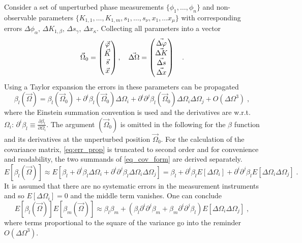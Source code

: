 Consider a set of unperturbed phase measurements $ \{\phi_1, \ldots, \phi_n\} $ and non-observable  parameters $  \{ K_{1,1} , \ldots , K_{1,m}, s_1, \ldots, s_{\nu}, x_1, \ldots x_{\mu} \} $ with corresponding errors $ \Delta \phi_\alpha,\, \Delta K_{1,\beta}, \,\Delta s_\gamma,\, \Delta x_\kappa  $.
Collecting all parameters into a vector
%
\begin{equation}
\vec{\Omega}_0 =
\begin{pmatrix}
\vec{\varphi}\\
\vec{K}\\
\vec{s}\\
\vec{x}
\end{pmatrix},\quad
\vec{\Delta \Omega} = 
\begin{pmatrix}
\vec{\Delta\varphi}\\
\vec{\Delta K}\\
\vec{\Delta s}\\
\vec{\Delta x}
\end{pmatrix}
\quad .
\end{equation}
%
Using a Taylor expansion the errors in these parameters can be propagated
%
\begin{equation}
\beta_l (\vec{\Omega}) = \beta_l(\vec{\Omega}_0) + \partial^i\beta_l(\vec{\Omega}_0)\Delta\Omega_i +  \partial^i\partial^j\beta_l(\vec{\Omega}_0)\Delta\Omega_i\Delta\Omega_j + O(\Delta\Omega^3)\;,
\label{eq:err_prop}
\end{equation}
%
where the Einstein summation convention is used and the derivatives are w.r.t. $ \Omega_i $: $ \partial^i\beta_l \equiv \frac{\partial \beta_l}{\partial \Omega_i} $.
The argument $ (\vec{\Omega}_0) $ is omitted in the following for the $ \beta $ function and its derivatives at the unperturbed position $ \vec{\Omega}_0 $. For the calculation of the covariance matrix,
\eqref{eq:err_prop} is truncated to second order and for convenience and readability,
the two summands of \eqref{eq_cov_form} are derived separately.
%
\begin{equation}
E[\beta_l(\vec{\Omega})] \approx E\left[   
\beta_l + \partial^i\beta_l\Delta\Omega_i +  \partial^i\partial^j\beta_l\Delta\Omega_i\Delta\Omega_j 
\right] =
\beta_l + \partial^i\beta_l E[\Delta\Omega_i] +  \partial^i\partial^j\beta_l E\left[\Delta\Omega_i\Delta\Omega_j \right]\;.
\end{equation}
%
 It is assumed that there are no systematic errors in the measurement instruments and so $ {E}[{\Delta\Omega_i}] =0$ and the middle term vanishes.
One can conclude
%
\begin{equation}
E[\beta_l(\vec{\Omega})]E[\beta_m(\vec{\Omega})] \approx \beta_l\beta_m +
 \left(\beta_l\partial^i\partial^j\beta_m +
 \beta_m\partial^i\partial^j\beta_l\right) E\left[\Delta\Omega_i\Delta\Omega_j \right]\;,
 \label{eq:Eb_Eb}
\end{equation}
%
 where terms proportional to the square of the variance go into the reminder $ O(\Delta\Omega^3) $.


